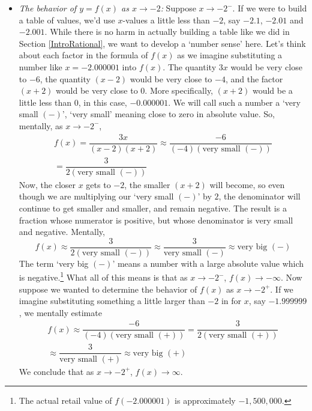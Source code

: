 \begin{ex}
\begin{enumerate}
\begin{itemize}
\item  \textit{The behavior of $y=f(x)$ as $x \rightarrow -2$:}  Suppose $x \rightarrow -2^{-}$.  If we were to build a table of values, we'd use $x$-values a little less than $-2$, say $-2.1$, $-2.01$ and $-2.001$.  While there is no harm in actually building a table like we did in Section \ref{IntroRational}, we want to develop a `number sense' here.  Let's think about each factor in the formula of $f(x)$ as we imagine substituting a number like $x=-2.000001$ into $f(x)$. The quantity $3x$ would be very close to $-6$, the quantity $(x-2)$ would be very close to $-4$, and the factor $(x+2)$ would be very close to $0$.  More specifically, $(x+2)$ would be a little less than $0$, in this case, $-0.000001.$  We will call such a number a `very small $(-)$', `very small' meaning close to zero in absolute value. So, mentally, as $x \rightarrow -2^{-}$,
\begin{multline*}
f(x)   = \dfrac{3x}{(x-2)(x+2)} \approx \dfrac{-6}{(-4)\left( \text{very small $(-)$}\right)} \\
= \dfrac{3}{2 \left( \text{very small $(-)$}\right)}
\end{multline*}
Now, the closer $x$ gets to $-2$, the smaller $(x+2)$ will become, so even though we are multiplying our `very small $(-)$' by $2$, the denominator will continue to get smaller and smaller, and remain negative.  The result is a fraction whose numerator is positive, but whose denominator is very small and negative.  Mentally,
\[
f(x) \approx \dfrac{3}{2 \left( \text{very small $(-)$}\right)} \approx \dfrac{3}{\text{very small $(-)$}} \approx \text{very big $(-)$}
\]
The term `very big $(-)$' means a number with a large absolute value which is negative.\footnote{The actual retail value of $f(-2.000001)$ is approximately $-1,\!500,\!000$.}  What all of this means is that as $x \rightarrow -2^{-}$, $f(x) \rightarrow -\infty$.  Now suppose we wanted to determine the behavior of $f(x)$ as $x \rightarrow -2^{+}$.  If we imagine substituting something a little larger than $-2$ in for $x$, say $-1.999999$, we mentally estimate
\begin{multline*}
f(x) \approx \dfrac{-6}{(-4)\left( \text{very small $(+)$}\right)} = \dfrac{3}{2 \left( \text{very small $(+)$}\right)} \\
\approx \dfrac{3}{\text{very small $(+)$}} \approx \text{very big $(+)$}
\end{multline*}
We conclude that as $x \rightarrow -2^{+}$, $f(x) \rightarrow \infty$.


\end{itemize}
\end{enumerate}
\end{ex}
